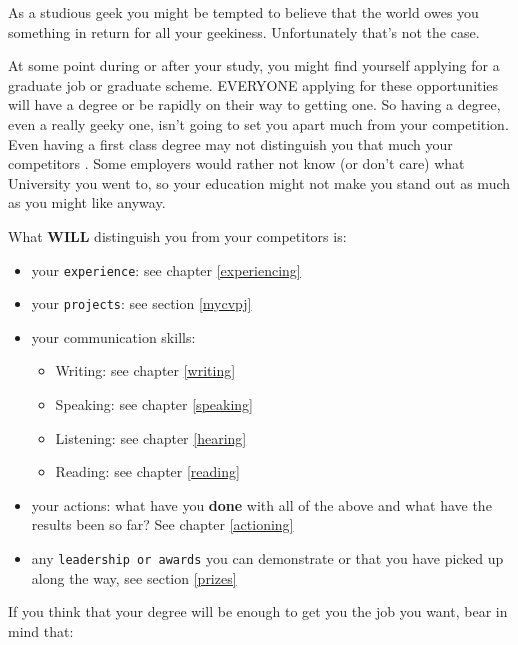 \documentclass[
]{book}
\providecommand{\tightlist}{%
  \setlength{\itemsep}{0pt}\setlength{\parskip}{0pt}}
\begin{document}
As a studious geek you might be tempted to believe that the world owes you something in return for all your geekiness. Unfortunately that's not the case.

At some point during or after your study, you might find yourself applying for a graduate job or graduate scheme. EVERYONE applying for these opportunities will have a degree or be rapidly on their way to getting one. So having a degree, even a really geeky one, isn't going to set you apart much from your competition. Even having a first class degree may not distinguish you that much your competitors \citep{gradeinflation, firstclass}. Some employers would rather not know (or don't care) what University you went to, so your education might not make you stand out as much as you might like anyway. \citep{bigfour, eyfirm}

What \textbf{WILL} distinguish you from your competitors is:

\begin{itemize}
\tightlist
\item
  your \texttt{experience}: see chapter \ref{experiencing}
\item
  your \texttt{projects}: see section \ref{mycvpj}
\item
  your communication skills:

  \begin{itemize}
  \tightlist
  \item
    Writing: see chapter \ref{writing}
  \item
    Speaking: see chapter \ref{speaking}
  \item
    Listening: see chapter \ref{hearing}
  \item
    Reading: see chapter \ref{reading}
  \end{itemize}
\item
  your actions: what have you \textbf{done} with all of the above and what have the results been so far? See chapter \ref{actioning}\\
\item
  any \texttt{leadership\ or\ awards} you can demonstrate or that you have picked up along the way, see section \ref{prizes}
\end{itemize}

If you think that your degree will be enough to get you the job you want, bear in mind that:
\end{document}
